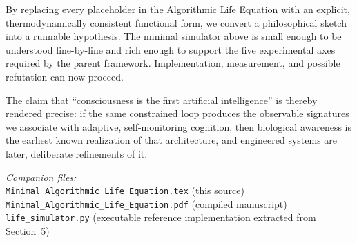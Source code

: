 \documentclass[11pt,a4paper]{article}
\begin{document}
By replacing every placeholder in the Algorithmic Life Equation with an explicit, thermodynamically consistent functional form, we convert a philosophical sketch into a runnable hypothesis. The minimal simulator above is small enough to be understood line-by-line and rich enough to support the five experimental axes required by the parent framework. Implementation, measurement, and possible refutation can now proceed.

The claim that ``consciousness is the first artificial intelligence'' is thereby rendered precise: if the same constrained loop produces the observable signatures we associate with adaptive, self-monitoring cognition, then biological awareness is the earliest known realization of that architecture, and engineered systems are later, deliberate refinements of it.

\vspace{1.5em}
\noindent\textit{Companion files:}\\
\texttt{Minimal\_Algorithmic\_Life\_Equation.tex} (this source)\\
\texttt{Minimal\_Algorithmic\_Life\_Equation.pdf} (compiled manuscript)\\
\texttt{life\_simulator.py} (executable reference implementation extracted from Section~5)
\end{document}
